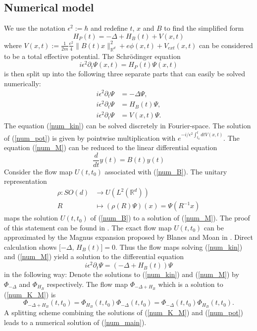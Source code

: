 \documentclass[11pt, a4paper, oneside]{article}
\begin{document}
\subsection{Numerical model}
We use the notation $\epsilon ^2 := \hbar$ and redefine $t$, $x$ and $B$ to find the simplified form
\begin{equation*}
  H_P(t) = -\Delta + H_B(t) + V(x,t)
\end{equation*}
where $V(x,t) := \frac{1}{2m}\frac{e^{2}}{4}\|B(t) x\|_{\mathbb{R}^{d}}^{2} + e \phi(x,t) + V_{ext}(x,t)$ can be considered to be a total effective potential.
The Schr{\"o}dinger equation
\begin{equation*} \label{num_main} \tag{H}
  i \epsilon ^2 \partial_t \Psi(x, t) = H_P(t)\Psi(x,t)
\end{equation*}
is then split up into the following three separate parts that can easily be solved numerically:
\begin{align}
  i \epsilon^2 \partial_t \Psi &= -\Delta \Psi \label{num_kin} \tag{K},\\
  i \epsilon^2 \partial_t \Psi &= H_B(t) \Psi \label{num_M} \tag{M},\\
  i \epsilon^2 \partial_t \Psi &= V(x,t) \Psi \label{num_pot} \tag{P}.
\end{align}
The equation (\ref{num_kin}) can be solved discretely in Fourier-space. The solution of (\ref{num_pot}) is given by pointwise multiplication with $e^{-i/\epsilon ^2 \int_{t_0}^t dt V(x,t)}$. The equation (\ref{num_M}) can be reduced to the linear differential equation
\begin{equation} \label{num_B} \tag{B}
  \frac{d}{dt}y(t) = B(t)y(t)
\end{equation}
Consider the flow map $U(t,t_0)$ associated with (\ref{num_B}). The unitary representation
\begin{align} \label{eq_rho}
  \rho : SO(d) &\longrightarrow U(L^2(\mathbb{R}^d)) \\
  R &\longmapsto (\rho (R)\Psi)(x) = \Psi(R^{-1} x)
\end{align}
maps the solution $U(t, t_0)$ of (\ref{num_B}) to a solution of (\ref{num_M}). The proof of this statement can be found in . The exact flow map $U(t, t_0)$ can be approximated by the Magnus expansion proposed by Blanes and Moan in .
Direct calculation shows  $[-\Delta$, $H_B(t)] = 0$. Thus the flow maps solving (\ref{num_kin}) and (\ref{num_M}) yield a solution to the differential equation
\begin{equation} \label{num_K_M} \tag{K+M}
  i \epsilon ^2 \partial_t \Psi = (-\Delta + H_B(t))\Psi
\end{equation}
in the following way: Denote the solutions to (\ref{num_kin}) and (\ref{num_M}) by $\Phi_{-\Delta}$ and $\Phi_{H_B}$ respectively. The flow map $\Phi_{-\Delta + H_B}$ which is a solution to (\ref{num_K_M}) is
\begin{equation*}
  \Phi_{-\Delta + H_B}(t, t_0) = \Phi_{H_B}(t, t_0)\Phi_{-\Delta}(t, t_0) = \Phi_{-\Delta}(t, t_0)\Phi_{H_B}(t, t_0).
\end{equation*}
A splitting scheme combining the solutions of (\ref{num_K_M}) and (\ref{num_pot}) leads to a numerical solution of (\ref{num_main}).
\end{document}
